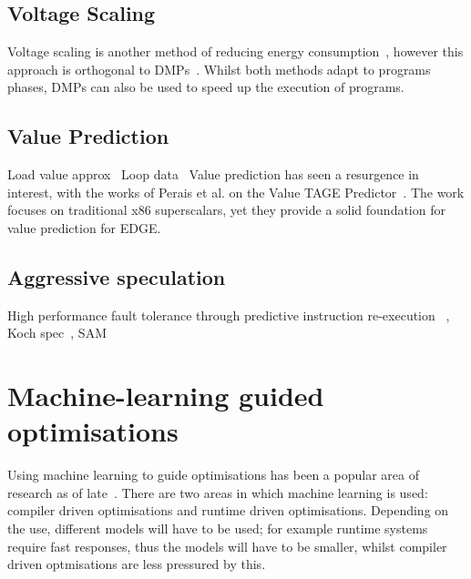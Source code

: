 \subsection{Voltage Scaling}
Voltage scaling is another method of reducing energy consumption~\cite{paganiEECHM2017}, however this approach is orthogonal to DMPs~\cite{sibi2014}.
Whilst both methods adapt to programs phases, DMPs can also be used to speed up the execution of programs.

\subsection{Value Prediction}
Load value approx~\cite{miguel2014LoadVal}
Loop data~\cite{murphy2016loopdata}
Value prediction has seen a resurgence in interest, with the works of Perais et al. on the Value TAGE Predictor~\cite{peraisBeBop2015,peraisVTAGE2014}.
The work focuses on traditional x86 superscalars, yet they provide a solid foundation for value prediction for EDGE.

\subsection{Aggressive speculation}

High performance fault tolerance through predictive instruction re-execution ~\cite{soman2017predinst}, Koch spec~\cite{koch2013spec}, SAM~\cite{Abeydeera2017SpecMulti}

\section{Machine-learning guided optimisations}

Using machine learning to guide optimisations has been a popular area of research as of late~\cite{cummins2017pact,wang2018ml,dubach13dynamic}.
There are two areas in which machine learning is used: compiler driven optimisations and runtime driven optimisations.
Depending on the use, different models will have to be used; for example runtime systems require fast responses, thus the models will have to be smaller, whilst compiler driven optmisations are less pressured by this.
